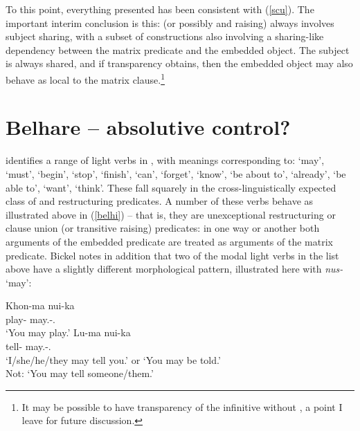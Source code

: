 \documentclass[output=paper]{langsci/langscibook}
\begin{document}
\ea \label{belhmv}\begin{xlista}
	\end{xlista}
\z

To this point, everything presented has been consistent with (\ref{scu}). The
important interim conclusion is this:  (or possibly  and raising)
always involves subject sharing, with a subset of  constructions also
involving a sharing-like dependency between the matrix predicate and the
embedded object. The subject is always shared, and if transparency obtains,
then the embedded object may also behave as local to the matrix
clause.\footnote{It may be possible to have transparency of the infinitive
without , a point I leave for future discussion.}

\section{Belhare -- absolutive control?}

\citet{bickel04} identifies a range of light verbs in , with meanings
corresponding to: `may', `must', `begin', `stop', `finish', `can', `forget',
`know', `be about to', `already', `be able to', `want', `think'. These fall
squarely in the cross-linguistically expected class of  and
restructuring predicates. A number of these verbs behave as illustrated above
in (\ref{belhi}) -- that is, they are unexceptional restructuring or clause
union (or transitive raising) predicates: in one way or another both arguments
of the embedded predicate are treated as arguments of the matrix predicate.
Bickel notes in addition that two of the  modal light verbs in the list
above have a slightly different morphological pattern, illustrated here with
\emph{nus-} `may':

\ea \label{belh}
	\begin{xlista}
	\ex \gll Khon-ma nui-ka \\
	play-\Inf{} may.\Npst-\Second.\Su{} \\
	\glt `You may play.'
	\ex \gll Lu-ma nui-ka \\
	tell-\Inf{} may.\Npst-\Second.\Su{} \\
	\glt `I/she/he/they may tell you.' or `You may be told.'\\Not: `You may tell someone/them.'
	\end{xlista}
\z
\end{document}
